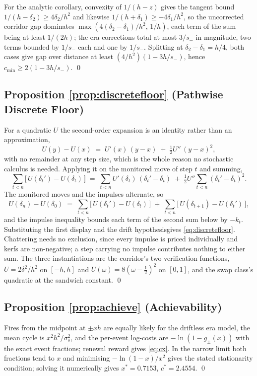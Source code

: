 \documentclass[11pt,a4paper]{article}
\theoremstyle{definition}
\theoremstyle{plain}
\theoremstyle{remark}
\begin{document}
For the analytic corollary, convexity of $1/(h - z)$ gives the tangent bound $1/(h - \delta_2) \ge 4\delta_2/h^2$ and likewise $1/(h + \delta_1) \ge -4\delta_1/h^2$, so the uncorrected corridor
gap dominates $\max(4(\delta_2 - \delta_1)/h^2,\, 1/h)$, each term of the sum being at least $1/(2h)$; the era corrections total at most $3/s_-$ in magnitude, two terms bounded by $1/s_-$ each and one 
by $1/s_-$. Splitting at $\delta_2 - \delta_1 = h/4$, both cases give gap over distance at least $(4/h^2)(1 - 3h/s_-)$, hence $c_{\min} \ge 2(1 - 3h/s_-)$. \qed

\subsection{Proposition \ref{prop:discretefloor} (Pathwise Discrete
Floor)}

For a quadratic $U$ the second-order expansion is an identity rather than an approximation,
\[
U(y) - U(x) \;=\; U'(x)\,(y - x) \;+\; \tfrac12 U''\,(y - x)^2 ,
\]
with no remainder at any step size, which is the whole reason no stochastic calculus is needed. Applying it on the monitored move of step $t$ and summing,
\[
\sum_{t<n} \big[\, U(\delta_t') - U(\delta_t) \,\big]
\;=\; \sum_{t<n} U'(\delta_t)\,(\delta_t' - \delta_t)
\;+\; \tfrac12 U'' \sum_{t<n} (\delta_t' - \delta_t)^2 .
\]
The monitored moves and the impulses alternate, so
\[
U(\delta_n) - U(\delta_0)
\;=\; \sum_{t<n} \big[\, U(\delta_t') - U(\delta_t) \,\big]
\;+\; \sum_{t<n} \big[\, U(\delta_{t+1}) - U(\delta_t') \,\big],
\]
and the impulse inequality bounds each term of the second sum below by $-k_t$. Substituting the first display and the drift hypothesisgives \eqref{eq:discretefloor}. Chattering needs no exclusion, since
every impulse is priced individually and kerfs are non-negative; a step carrying no impulse contributes nothing to either sum. The three instantiations are the corridor's two verification functions,
$U = 2\delta^2/h^2$ on $[-h, h]$ and $U(\omega) = 8(\omega - \tfrac12)^2$ on $[0,1]$, and the swap class's quadratic at the sandwich constant. \qed

\subsection{Proposition \ref{prop:achieve} (Achievability)}

Fires from the midpoint at $\pm x h$ are equally likely for the driftless era model, the mean cycle is $x^2 h^2/\sigma_s^2$, and the per-event log-costs are $-\ln(1 - g_{\pm}(x))$ with the
exact event fractions; renewal reward gives \eqref{eq:cx}. In the narrow limit both fractions tend to $x$ and minimising $-\ln(1-x)/x^2$ gives the stated stationarity condition; solving it
numerically gives $x^* = 0.7153$, $c^* = 2.4554$. \qed
\end{document}
